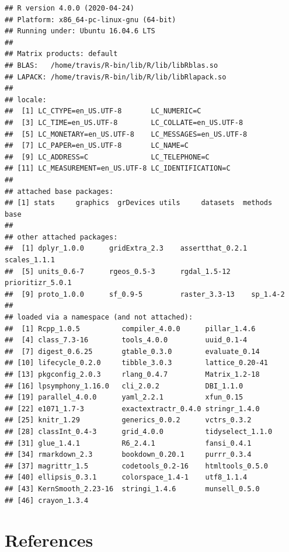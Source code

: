\documentclass[12pt,]{book}
\begin{document}
\begin{verbatim}
## R version 4.0.0 (2020-04-24)
## Platform: x86_64-pc-linux-gnu (64-bit)
## Running under: Ubuntu 16.04.6 LTS
## 
## Matrix products: default
## BLAS:   /home/travis/R-bin/lib/R/lib/libRblas.so
## LAPACK: /home/travis/R-bin/lib/R/lib/libRlapack.so
## 
## locale:
##  [1] LC_CTYPE=en_US.UTF-8       LC_NUMERIC=C              
##  [3] LC_TIME=en_US.UTF-8        LC_COLLATE=en_US.UTF-8    
##  [5] LC_MONETARY=en_US.UTF-8    LC_MESSAGES=en_US.UTF-8   
##  [7] LC_PAPER=en_US.UTF-8       LC_NAME=C                 
##  [9] LC_ADDRESS=C               LC_TELEPHONE=C            
## [11] LC_MEASUREMENT=en_US.UTF-8 LC_IDENTIFICATION=C       
## 
## attached base packages:
## [1] stats     graphics  grDevices utils     datasets  methods   base     
## 
## other attached packages:
##  [1] dplyr_1.0.0      gridExtra_2.3    assertthat_0.2.1 scales_1.1.1    
##  [5] units_0.6-7      rgeos_0.5-3      rgdal_1.5-12     prioritizr_5.0.1
##  [9] proto_1.0.0      sf_0.9-5         raster_3.3-13    sp_1.4-2        
## 
## loaded via a namespace (and not attached):
##  [1] Rcpp_1.0.5          compiler_4.0.0      pillar_1.4.6       
##  [4] class_7.3-16        tools_4.0.0         uuid_0.1-4         
##  [7] digest_0.6.25       gtable_0.3.0        evaluate_0.14      
## [10] lifecycle_0.2.0     tibble_3.0.3        lattice_0.20-41    
## [13] pkgconfig_2.0.3     rlang_0.4.7         Matrix_1.2-18      
## [16] lpsymphony_1.16.0   cli_2.0.2           DBI_1.1.0          
## [19] parallel_4.0.0      yaml_2.2.1          xfun_0.15          
## [22] e1071_1.7-3         exactextractr_0.4.0 stringr_1.4.0      
## [25] knitr_1.29          generics_0.0.2      vctrs_0.3.2        
## [28] classInt_0.4-3      grid_4.0.0          tidyselect_1.1.0   
## [31] glue_1.4.1          R6_2.4.1            fansi_0.4.1        
## [34] rmarkdown_2.3       bookdown_0.20.1     purrr_0.3.4        
## [37] magrittr_1.5        codetools_0.2-16    htmltools_0.5.0    
## [40] ellipsis_0.3.1      colorspace_1.4-1    utf8_1.1.4         
## [43] KernSmooth_2.23-16  stringi_1.4.6       munsell_0.5.0      
## [46] crayon_1.3.4
\end{verbatim}

\chapter{References}\label{references}


\end{document}
